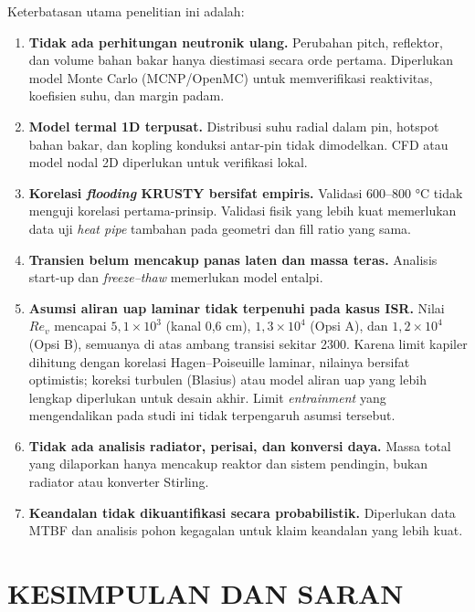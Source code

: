 \documentclass[
  indonesian,
  12pt,
  a4paper,
]{report}
\providecommand{\tightlist}{%
  \setlength{\itemsep}{0pt}\setlength{\parskip}{0pt}}
\begin{document}
Keterbatasan utama penelitian ini adalah:

\begin{enumerate}
\def\labelenumi{\arabic{enumi}.}
\tightlist
\item
  \textbf{Tidak ada perhitungan neutronik ulang.} Perubahan pitch,
  reflektor, dan volume bahan bakar hanya diestimasi secara orde
  pertama. Diperlukan model Monte Carlo (MCNP/OpenMC) untuk
  memverifikasi reaktivitas, koefisien suhu, dan margin padam.
\item
  \textbf{Model termal 1D terpusat.} Distribusi suhu radial dalam pin,
  hotspot bahan bakar, dan kopling konduksi antar-pin tidak dimodelkan.
  CFD atau model nodal 2D diperlukan untuk verifikasi lokal.
\item
  \textbf{Korelasi \emph{flooding} KRUSTY bersifat empiris.} Validasi
  600--800 °C tidak menguji korelasi pertama-prinsip. Validasi fisik
  yang lebih kuat memerlukan data uji \emph{heat pipe} tambahan pada
  geometri dan fill ratio yang sama.
\item
  \textbf{Transien belum mencakup panas laten dan massa teras.} Analisis
  start-up dan \emph{freeze--thaw} memerlukan model entalpi.
\item
  \textbf{Asumsi aliran uap laminar tidak terpenuhi pada kasus ISR.}
  Nilai \(Re_v\) mencapai \(5{,}1\times10^3\) (kanal 0,6 cm),
  \(1{,}3\times10^4\) (Opsi A), dan \(1{,}2\times10^4\) (Opsi B),
  semuanya di atas ambang transisi sekitar 2300. Karena limit kapiler
  dihitung dengan korelasi Hagen--Poiseuille laminar, nilainya bersifat
  optimistis; koreksi turbulen (Blasius) atau model aliran uap yang
  lebih lengkap diperlukan untuk desain akhir. Limit \emph{entrainment}
  yang mengendalikan pada studi ini tidak terpengaruh asumsi tersebut.
\item
  \textbf{Tidak ada analisis radiator, perisai, dan konversi daya.}
  Massa total yang dilaporkan hanya mencakup reaktor dan sistem
  pendingin, bukan radiator atau konverter Stirling.
\item
  \textbf{Keandalan tidak dikuantifikasi secara probabilistik.}
  Diperlukan data MTBF dan analisis pohon kegagalan untuk klaim
  keandalan yang lebih kuat.
\end{enumerate}

\chapter{KESIMPULAN DAN SARAN}\label{sec-conclusion-recommendation}
\end{document}
